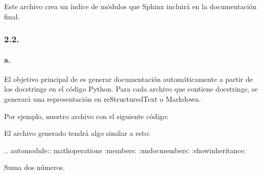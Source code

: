 \documentclass[a4paper,10pt,oneside,spanish,openany]{sphinxmanual}
\begin{document}
\sphinxAtStartPar
Este archivo crea un índice de módulos que Sphinx incluirá en la documentación final.


\subsubsection{2.2. }
\label{\detokenize{configuracion_inicial/007.Creacion_de_ficheros_de_codigo_y_generacion_automatica_de_documentacion:contenido-de-los-archivos-generados}}

\paragraph{a. }
\label{\detokenize{configuracion_inicial/007.Creacion_de_ficheros_de_codigo_y_generacion_automatica_de_documentacion:a-documentacion-generada-automaticamente-desde-el-codigo}}
\sphinxAtStartPar
El objetivo principal de  es generar documentación automáticamente a partir de los docstrings en el código Python. Para cada archivo  que contiene docstrings, se generará una representación en reStructuredText o Markdown.

\sphinxAtStartPar
Por ejemplo, nuestro archivo  con el siguiente código:

\begin{sphinxVerbatim}[commandchars=\\\{\}]
  
       

\end{sphinxVerbatim}

\sphinxAtStartPar
El archivo  generado tendrá algo similar a esto:

\begin{sphinxVerbatim}[commandchars=\\\{\}]

.. automodule:: math\PYGZus{}operations
   :members:
   :undoc\PYGZhy{}members:
   :show\PYGZhy{}inheritance:


Suma dos números.
\end{sphinxVerbatim}
\end{document}
